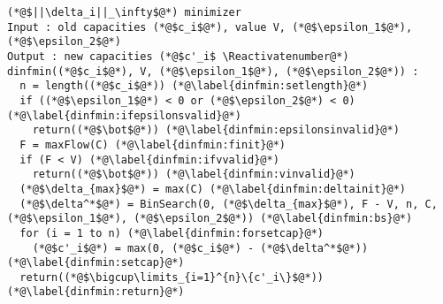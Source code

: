 \Suppressnumber
\begin{lstlisting}[label=dinf, style=numbers]
(*@$||\delta_i||_\infty$@*) minimizer
Input : old capacities (*@$c_i$@*), value V, (*@$\epsilon_1$@*), (*@$\epsilon_2$@*)
Output : new capacities (*@$c'_i$ \Reactivatenumber@*)
dinfmin((*@$c_i$@*), V, (*@$\epsilon_1$@*), (*@$\epsilon_2$@*)) :
  n = length((*@$c_i$@*)) (*@\label{dinfmin:setlength}@*)
  if ((*@$\epsilon_1$@*) < 0 or (*@$\epsilon_2$@*) < 0) (*@\label{dinfmin:ifepsilonsvalid}@*)
    return((*@$\bot$@*)) (*@\label{dinfmin:epsilonsinvalid}@*)
  F = maxFlow(C) (*@\label{dinfmin:finit}@*)
  if (F < V) (*@\label{dinfmin:ifvvalid}@*)
    return((*@$\bot$@*)) (*@\label{dinfmin:vinvalid}@*)
  (*@$\delta_{max}$@*) = max(C) (*@\label{dinfmin:deltainit}@*)
  (*@$\delta^*$@*) = BinSearch(0, (*@$\delta_{max}$@*), F - V, n, C, (*@$\epsilon_1$@*), (*@$\epsilon_2$@*)) (*@\label{dinfmin:bs}@*)
  for (i = 1 to n) (*@\label{dinfmin:forsetcap}@*)
    (*@$c'_i$@*) = max(0, (*@$c_i$@*) - (*@$\delta^*$@*)) (*@\label{dinfmin:setcap}@*)
  return((*@$\bigcup\limits_{i=1}^{n}\{c'_i\}$@*)) (*@\label{dinfmin:return}@*)
\end{lstlisting}
